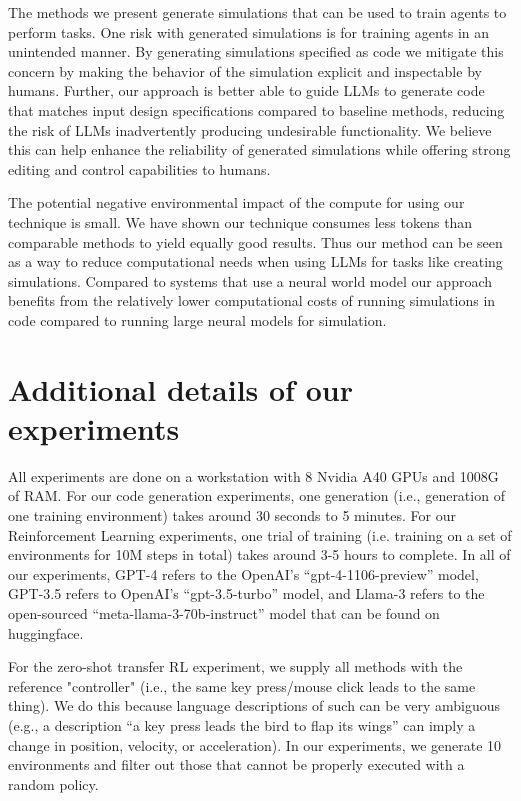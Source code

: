 \documentclass{article}
\theoremstyle{plain}
\theoremstyle{definition}
\theoremstyle{remark}
\begin{document}
The methods we present generate simulations that can be used to train agents to perform tasks.
One risk with generated simulations is for training agents in an unintended manner.
By generating simulations specified as code we mitigate this concern by making the behavior of the simulation explicit and inspectable by humans.
Further, our approach is better able to guide LLMs to generate code that matches input design specifications compared to baseline methods, reducing the risk of LLMs inadvertently producing undesirable functionality.
We believe this can help enhance the reliability of generated simulations while offering strong editing and control capabilities to humans.

The potential negative environmental impact of the compute for using our technique is small.
We have shown our technique consumes less tokens than comparable methods to yield equally good results.
Thus our method can be seen as a way to reduce computational needs when using LLMs for tasks like creating simulations.
Compared to systems that use a neural world model our approach benefits from the relatively lower computational costs of running simulations in code compared to running large neural models for simulation.




\section{Additional details of our experiments}
\label{sec:experiment_details}
All experiments are done on a workstation with 8 Nvidia A40 GPUs and
1008G of RAM. For our code generation experiments, one generation (i.e., generation of one training environment) takes around 30 seconds to 5 minutes. For our Reinforcement Learning experiments, one trial of training (i.e. training on a set of environments for 10M steps in total) takes around 3-5 hours to complete.
In all of our experiments, GPT-4 refers to the OpenAI's ``gpt-4-1106-preview'' model, GPT-3.5 refers to OpenAI's ``gpt-3.5-turbo'' model, and Llama-3 refers to the open-sourced ``meta-llama-3-70b-instruct'' model that can be found on huggingface.

For the zero-shot transfer RL experiment, we supply all methods with the reference "controller" (i.e., the same key press/mouse click leads to the same thing). We do this because language descriptions of such can be very ambiguous (e.g., a description ``a key press leads the bird to flap its wings'' can imply a change in position, velocity, or acceleration). In our experiments, we generate 10 environments and filter out those that cannot be properly executed with a random policy. 
\end{document}
